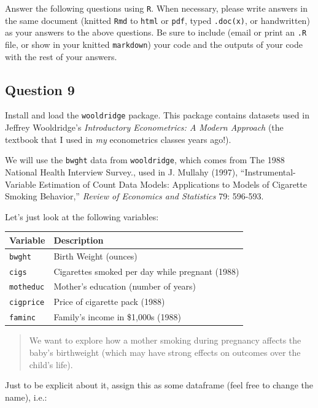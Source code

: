 \documentclass[
]{article}
\begin{document}
Answer the following questions using \texttt{R}. When necessary, please
write answers in the same document (knitted \texttt{Rmd} to
\texttt{html} or \texttt{pdf}, typed \texttt{.doc(x)}, or handwritten)
as your answers to the above questions. Be sure to include (email or
print an \texttt{.R} file, or show in your knitted \texttt{markdown})
your code and the outputs of your code with the rest of your answers.

\hypertarget{question-9}{%
\subsection{Question 9}\label{question-9}}

Install and load the \texttt{wooldridge} package. This package contains
datasets used in Jeffrey Wooldridge's \emph{Introductory Econometrics: A
Modern Approach} (the textbook that I used in \emph{my} econometrics
classes years ago!).

We will use the \texttt{bwght} data from \texttt{wooldridge}, which
comes from The 1988 National Health Interview Survey., used in J.
Mullahy (1997), ``Instrumental-Variable Estimation of Count Data Models:
Applications to Models of Cigarette Smoking Behavior,'' \emph{Review of
Economics and Statistics} 79: 596-593.

Let's just look at the following variables:

\begin{longtable}[]{@{}ll@{}}
\toprule
Variable & Description \\
\midrule
\endhead
\texttt{bwght} & Birth Weight (ounces) \\
\texttt{cigs} & Cigarettes smoked per day while pregnant (1988) \\
\texttt{motheduc} & Mother's education (number of years) \\
\texttt{cigprice} & Price of cigarette pack (1988) \\
\texttt{faminc} & Family's income in \$1,000s (1988) \\
\bottomrule
\end{longtable}

\begin{quote}
We want to explore how a mother smoking during pregnancy affects the
baby's birthweight (which may have strong effects on outcomes over the
child's life).
\end{quote}

Just to be explicit about it, assign this as some dataframe (feel free
to change the name), i.e.:
\end{document}
